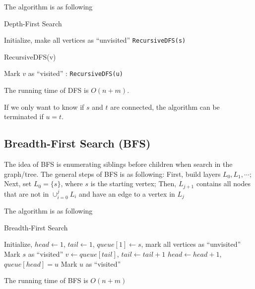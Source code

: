 				The algorithm is as following
				\begin{algorithm}[h]
					\caption{Depth-First Search}
					\begin{algorithmic}[1]
						\State Initialize, make all vertices as ``unvisited''
						\State \texttt{RecursiveDFS(s)}
					\end{algorithmic}
				\end{algorithm}

				\begin{algorithm}[h]
					\caption{RecursiveDFS(v)}
					\begin{algorithmic}[1]
						\State Mark $v$ as ``visited''
						:
								\State \texttt{RecursiveDFS(u)}
							\EndIf
						\EndFor
					\end{algorithmic}
				\end{algorithm}

				The running time of DFS is $O(n + m)$.

				If we only want to know if $s$ and $t$ are connected, the algorithm can be terminated if $u = t$.

			\subsection{Breadth-First Search (BFS)}
				The idea of BFS is enumerating siblings before children when search in the graph/tree. The general steps of BFS is as following: First, build layers $L_0, L_1, \cdots$; Next, set $L_0 = \{s\}$, where $s$ is the starting vertex; Then, $L_{j + 1}$ contains all nodes that are not in $\cup_{i = 0}^j L_i$ and have an edge to a vertex in $L_j$

				The algorithm is as following
				\begin{algorithm}[h]
					\caption{Breadth-First Search}
					\begin{algorithmic}[1]
						\State Initialize, $head \gets 1$, $tail \gets 1$, $queue[1] \gets s$, mark all vertices as ``unvisited''
						\State Mark $s$ as ``visited''
							\State $v \gets queue[tail]$, $tail \gets tail + 1$
									\State $head \gets head + 1$, $queue[head] = u$
									\State Mark $u$ as ``visited''
								\EndIf
							\EndFor
						\EndWhile
					\end{algorithmic}
				\end{algorithm}

				The running time of BFS is $O(n + m)$

